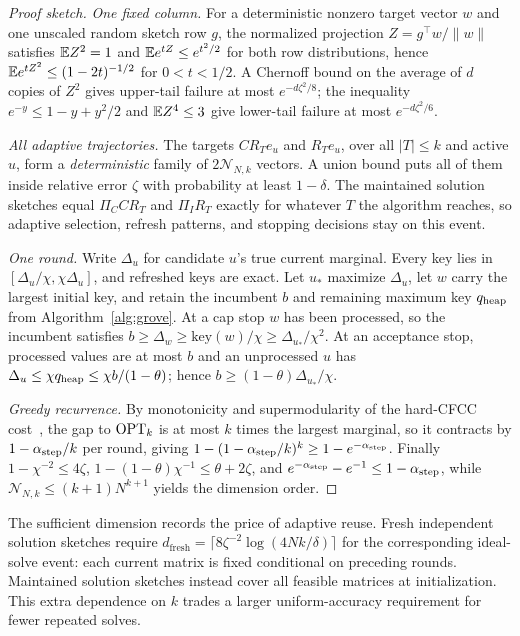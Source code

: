 \begin{proof}[Proof sketch]
\emph{One fixed column.} For a deterministic nonzero target vector
$w$ and one unscaled random sketch row $g$, the normalized projection
$Z=g^\top w/\|w\|$ satisfies $\mathbb E Z^2=1$ and
$\mathbb E e^{tZ}\leq e^{t^2/2}$ for both row distributions, hence
$\mathbb E e^{tZ^2}\leq(1-2t)^{-1/2}$ for $0<t<1/2$. A Chernoff bound on the
average of $d$ copies of $Z^2$ gives upper-tail failure at most
$e^{-d\zeta^2/8}$; the inequality $e^{-y}\leq1-y+y^2/2$ and
$\mathbb E Z^4\leq3$ give lower-tail failure at most $e^{-d\zeta^2/6}$.

\emph{All adaptive trajectories.} The targets $CR_Te_u$ and $R_Te_u$,
over all $|T|\leq k$ and active $u$, form a \emph{deterministic}
family of $2\mathcal N_{N,k}$ vectors. A union bound puts all of them inside
relative error $\zeta$ with probability at least $1-\delta$. The
maintained solution sketches equal $\Pi_C C R_T$ and $\Pi_I R_T$ exactly for whatever $T$ the
algorithm reaches, so adaptive selection, refresh patterns, and
stopping decisions stay on this event.

\emph{One round.} Write $\Delta_u$ for candidate $u$'s true
current marginal. Every key lies in $[\Delta_u/\chi,\chi\Delta_u]$,
and refreshed keys are exact. Let $u_*$ maximize $\Delta_u$, let $w$
carry the largest initial key, and retain the incumbent $b$ and
remaining maximum key $q_{\rm heap}$ from Algorithm~\ref{alg:grove}. At a cap
stop $w$ has been processed, so the incumbent satisfies
$b\geq\Delta_w\geq\mathrm{key}(w)/\chi\geq\Delta_{u_*}/\chi^2$. At an
acceptance stop, processed values are at most $b$ and an unprocessed
$u$ has $\Delta_u\leq\chi q_{\rm heap}\leq\chi b/(1-\theta)$; hence
$b\geq(1-\theta)\Delta_{u_*}/\chi$.

\emph{Greedy recurrence.} By monotonicity and supermodularity of the hard-CFCC
cost~\cite{li2019}, the gap to
$\mathrm{OPT}_k$ is at most $k$ times the largest marginal, so it contracts by
$1-\alpha_{\rm step}/k$ per round, giving $1-(1-\alpha_{\rm step}/k)^k\geq1-e^{-\alpha_{\rm step}}$.
Finally $1-\chi^{-2}\leq4\zeta$, $1-(1-\theta)\chi^{-1}\leq\theta+2\zeta$,
and $e^{-\alpha_{\rm step}}-e^{-1}\leq1-\alpha_{\rm step}$, while
$\mathcal N_{N,k}\leq(k+1)N^{k+1}$ yields the dimension order.
\end{proof}

The sufficient dimension records the price of adaptive reuse.
Fresh independent solution sketches require
$d_{\mathrm{fresh}}=\lceil8\zeta^{-2}\log(4Nk/\delta)\rceil$
for the corresponding ideal-solve event: each current matrix is fixed
conditional on preceding rounds. Maintained solution sketches instead cover all
feasible matrices at initialization. This extra dependence on $k$
trades a larger uniform-accuracy requirement for fewer repeated solves.

